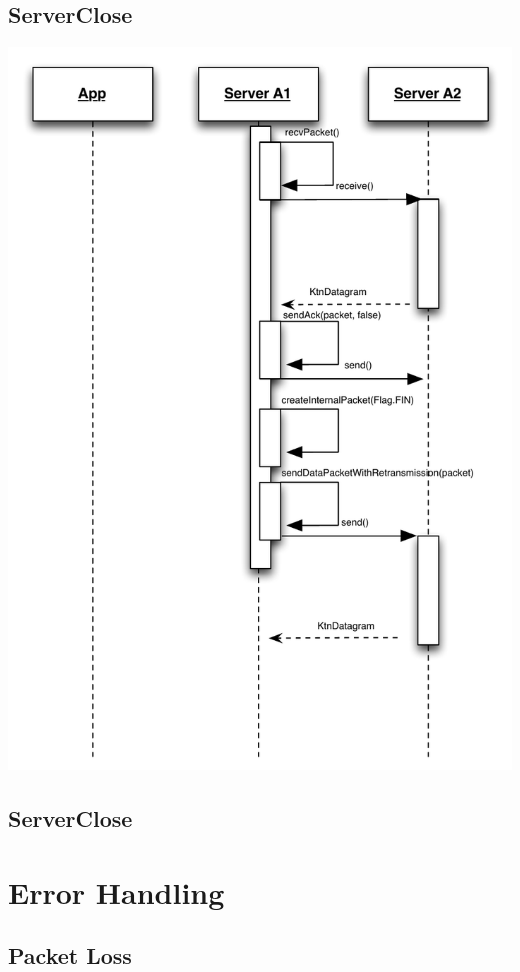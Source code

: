 \documentclass{article}
\begin{document}
\subsection{ServerClose}
\includegraphics[scale=0.95]{ktnServerClose.pdf}

\subsection{ServerClose}

\section{Error Handling}

\subsection{Packet Loss}
\end{document}
